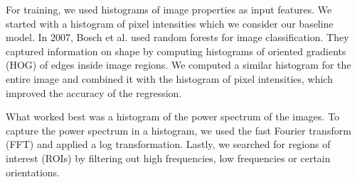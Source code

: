 \documentclass[10pt,conference,compsocconf]{IEEEtran}
\begin{document}
For training, we used histograms of image properties as input features. We started with a histogram of pixel intensities which we consider our baseline model. In 2007, Bosch et al.\@ \cite{Bosch} used random forests for image classification. They captured information on shape by computing histograms of oriented gradients (HOG) of edges inside image regions. We computed a similar histogram for the entire image and combined it with the histogram of pixel intensities, which improved the accuracy of the regression.

What worked best was a histogram of the power spectrum of the images. To capture the power spectrum in a histogram, we used the fast Fourier transform (FFT) and applied a log transformation. Lastly, we searched for regions of interest (ROIs) by filtering out high frequencies, low frequencies or certain orientations.
\end{document}
